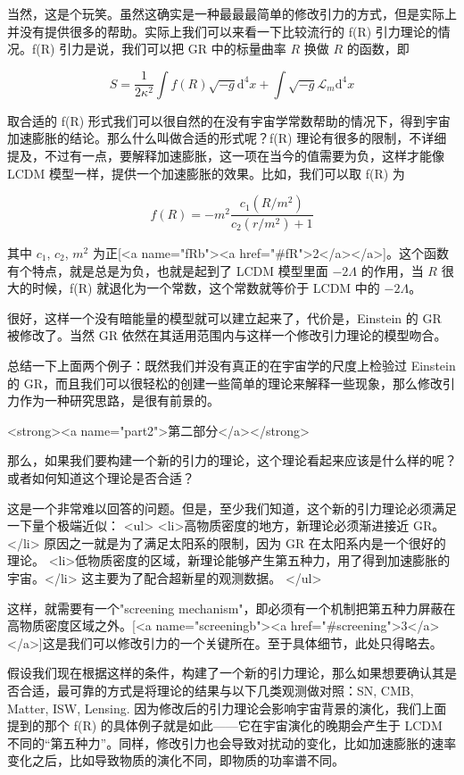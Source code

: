 \documentclass[12pt,a4paper]{article}
\begin{document}
当然，这是个玩笑。虽然这确实是一种最最最简单的修改引力的方式，但是实际上并没有提供很多的帮助。实际上我们可以来看一下比较流行的 f(R) 引力理论的情况。f(R) 引力是说，我们可以把 GR 中的标量曲率 $R$ 换做 $R$ 的函数，即

\begin{equation}
S=\frac{1}{2\kappa^2}\int f(R) \sqrt{-g}\mathrm d^4x+\int \sqrt{-g} \mathcal L_m \mathrm d^4x
\end{equation}

取合适的 f(R) 形式我们可以很自然的在没有宇宙学常数帮助的情况下，得到宇宙加速膨胀的结论。那么什么叫做合适的形式呢？f(R) 理论有很多的限制，不详细提及，不过有一点，要解释加速膨胀，这一项在当今的值需要为负，这样才能像 LCDM 模型一样，提供一个加速膨胀的效果。比如，我们可以取 f(R) 为

\begin{equation}
f(R)=-m^2\frac{c_1(R/m^2)}{c_2 (r/m^2)+1}
\end{equation}

其中 $c_1$, $c_2$, $m^2$ 为正[<a name="fRb"><a href="#fR">2</a></a>]。这个函数有个特点，就是总是为负，也就是起到了 LCDM 模型里面 $-2\Lambda$ 的作用，当 $R$ 很大的时候，f(R) 就退化为一个常数，这个常数就等价于 LCDM 中的 $-2\Lambda$。

很好，这样一个没有暗能量的模型就可以建立起来了，代价是，Einstein 的 GR 被修改了。当然 GR 依然在其适用范围内与这样一个修改引力理论的模型吻合。

总结一下上面两个例子：既然我们并没有真正的在宇宙学的尺度上检验过 Einstein 的 GR，而且我们可以很轻松的创建一些简单的理论来解释一些现象，那么修改引力作为一种研究思路，是很有前景的。



<strong><a name="part2">第二部分</a></strong> 

那么，如果我们要构建一个新的引力的理论，这个理论看起来应该是什么样的呢？或者如何知道这个理论是否合适？

这是一个非常难以回答的问题。但是，至少我们知道，这个新的引力理论必须满足一下量个极端近似：
<ul>
	<li>高物质密度的地方，新理论必须渐进接近 GR。</li> 原因之一就是为了满足太阳系的限制，因为 GR 在太阳系内是一个很好的理论。
	<li>低物质密度的区域，新理论能够产生第五种力，用了得到加速膨胀的宇宙。</li> 这主要为了配合超新星的观测数据。
</ul>

这样，就需要有一个"screening mechanism"，即必须有一个机制把第五种力屏蔽在高物质密度区域之外。[<a name="screeningb"><a href="#screening">3</a></a>]这是我们可以修改引力的一个关键所在。至于具体细节，此处只得略去。

假设我们现在根据这样的条件，构建了一个新的引力理论，那么如果想要确认其是否合适，最可靠的方式是将理论的结果与以下几类观测做对照：SN, CMB, Matter, ISW, Lensing. 因为修改后的引力理论会影响宇宙背景的演化，我们上面提到的那个 f(R) 的具体例子就是如此——它在宇宙演化的晚期会产生于 LCDM 不同的“第五种力”。同样，修改引力也会导致对扰动的变化，比如加速膨胀的速率变化之后，比如导致物质的演化不同，即物质的功率谱不同。
\end{document}
